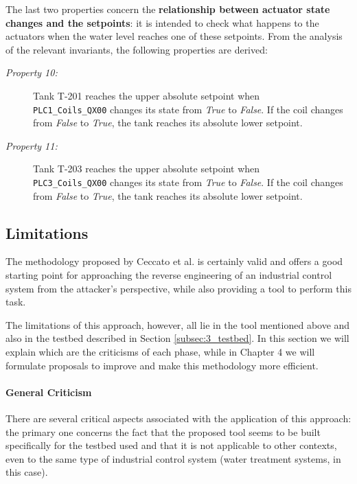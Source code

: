 The last two properties concern the \textbf{relationship between actuator state changes and the setpoints}: it is intended to check what happens to the actuators when the water level reaches one of these setpoints. From the analysis of the relevant invariants, the following properties are derived:

\begin{description}
	\item[\colorbox{backcolourtext}{\normalfont\textit{Property 10:}}] Tank T-201 reaches the upper absolute setpoint when\\ \texttt{PLC1\_Coils\_QX00} changes its state from \textit{True} to \textit{False}. If the coil changes from \textit{False} to \textit{True}, the tank reaches its absolute lower setpoint.
	
	\item[\colorbox{backcolourtext}{\normalfont\textit{Property 11:}}]
	Tank T-203 reaches the upper absolute setpoint when\\ \texttt{PLC3\_Coils\_QX00} changes its state from \textit{True} to \textit{False}. If the coil changes from \textit{False} to \textit{True}, the tank reaches its absolute lower setpoint.	 
\end{description}

\subsection{Limitations}
\label{subsec:3_ceccato_limitations}
The methodology proposed by Ceccato et al. is certainly valid and offers a good starting point for approaching the reverse engineering of an industrial control system from the attacker's perspective, while also providing a tool to perform this task.

\bigskip
The limitations of this approach, however, all lie in the tool mentioned above and also in the testbed described in Section \ref{subsec:3_testbed}. In this section we will explain which are the criticisms of each phase, while in Chapter 4 we will formulate proposals to improve and make this methodology more efficient.

\paragraph{General Criticism}
\label{par:3_limit_ceccato_general}
There are several critical aspects associated with the application of this approach: the primary one concerns the fact that the proposed tool seems to be built specifically for the testbed used and that it is not applicable to other contexts, even to the same type of industrial control system (water treatment systems, in this case). 

